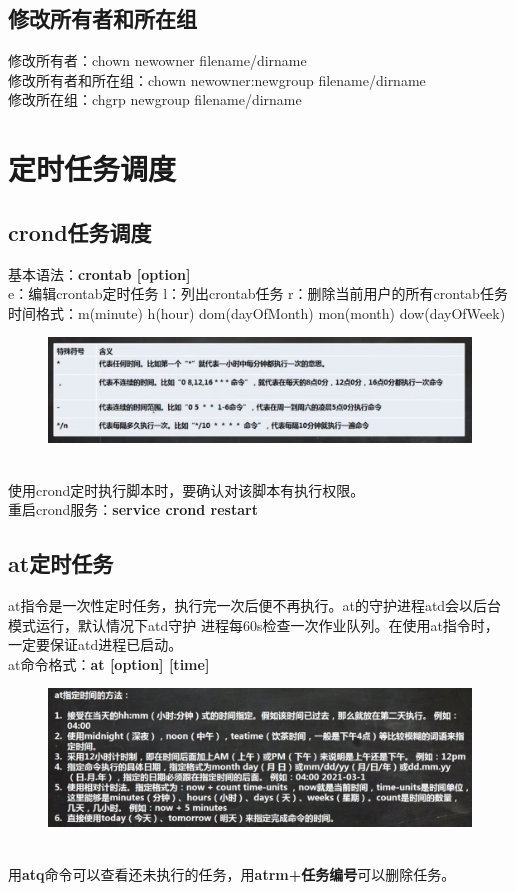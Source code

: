 \documentclass[11pt]{article}
\begin{document}
\subsection{修改所有者和所在组}
修改所有者：chown newowner filename/dirname \\
修改所有者和所在组：chown newowner:newgroup filename/dirname  \\
修改所在组：chgrp newgroup filename/dirname


\section{定时任务调度}

\subsection{crond任务调度}
基本语法：\textbf{crontab [option]}  \\
e：编辑crontab定时任务 \qquad l：列出crontab任务 \qquad r：删除当前用户的所有crontab任务 \\
时间格式：m(minute) h(hour) dom(dayOfMonth) mon(month) dow(dayOfWeek)  \\
\begin{figure}[htb]
    \centering
    \includegraphics[scale=0.3]{imgs/crontab.png}
\end{figure} \\
使用crond定时执行脚本时，要确认对该脚本有执行权限。  \\
重启crond服务：\textbf{service crond restart}

\subsection{at定时任务}
at指令是一次性定时任务，执行完一次后便不再执行。at的守护进程atd会以后台模式运行，默认情况下atd守护
进程每60s检查一次作业队列。在使用at指令时，一定要保证atd进程已启动。  \\
at命令格式：\textbf{at [option] [time]}  \\
\begin{figure}[htb]
    \centering
    \includegraphics[scale=0.27]{imgs/at_time.png}
\end{figure} \\
用\textbf{atq}命令可以查看还未执行的任务，用\textbf{atrm+任务编号}可以删除任务。
\end{document}
